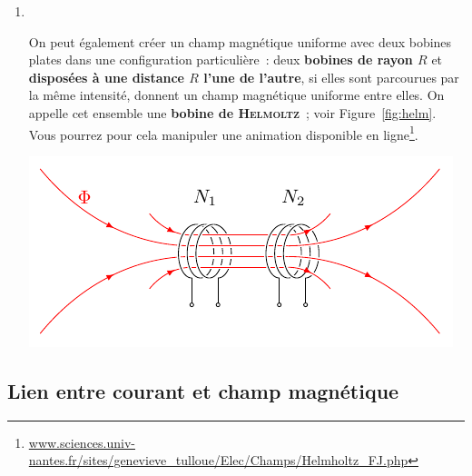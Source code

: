 \documentclass[../../main/main.tex]{subfiles}
\begin{document}
\begin{enumerate}
	\item
    ~
    \smallbreak
    \vspace{-15pt}
    \noindent
    \begin{minipage}[c]{.60\linewidth}
          On peut également créer un champ magnétique uniforme avec deux bobines
            plates dans une configuration particulière~: deux \textbf{bobines de
            rayon $R$} et \textbf{disposées à une distance $R$ l'une de l'autre}, si
            elles sont parcourues par la même intensité, donnent un champ magnétique
            uniforme entre elles. On appelle cet ensemble une \textbf{bobine de
            \textsc{Helmoltz}}~; voir Figure~\ref{fig:helm}.
            Vous pourrez pour cela manipuler une animation disponible en
            ligne\footnote{\url{www.sciences.univ-nantes.fr/sites/genevieve_tulloue/Elec/Champs/Helmholtz_FJ.php}}.
    \end{minipage}
    \hfill
    \begin{minipage}[c]{.38\linewidth}
      \begin{center}
          \includegraphics[width=\linewidth]{helmoltz}
        \label{fig:helm}
      \end{center}
      
    \end{minipage}
\end{enumerate}


\subsection{Lien entre courant et champ magnétique}
\label{ssec:lienicour}
\end{document}
